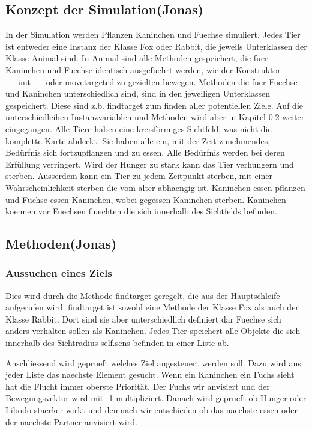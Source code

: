 \documentclass[12pt]{article}
\begin{document}
\subsection{Konzept der Simulation(Jonas)}
In der Simulation werden Pflanzen Kaninchen und Fuechse simuliert.
Jedes Tier ist entweder eine Instanz der Klasse \colorbox{gray!40}{Fox} oder
\colorbox{gray!40}{Rabbit}, die jeweils Unterklassen der Klasse
\colorbox{gray!40}{Animal} sind.
In Animal sind alle Methoden gespeichert, die fuer Kaninchen und Fuechse
identisch ausgefuehrt werden, wie der Konstruktor
\colorbox{gray!40}{\_\_init\_\_} oder \colorbox{gray!40}{movetargeted} zu gezielten bewegen.
Methoden die fuer Fuechse und Kaninchen unterschiedlich sind, sind in den
jeweiligen Unterklassen gespeichert.
Diese sind z.b. findtarget zum finden aller potentiellen Ziele.
Auf die unterschiedlcihen Instanzvariablen und Methoden wird aber in Kapitel \ref{methoden} weiter eingegangen.
Alle Tiere haben eine kreisförmiges Sichtfeld, was nicht die komplette Karte abdeckt.
Sie haben alle ein, mit der Zeit zunehmendes, Bedürfnis sich fortzupflanzen und zu essen.
Alle Bedürfnis werden bei deren Erfüllung verringert.
Wird der Hunger zu stark kann das Tier verhungern und sterben.
Ausserdem kann ein Tier zu jedem Zeitpunkt sterben, mit einer Wahrscheinlichkeit sterben die vom alter abhaengig ist.
Kaninchen essen pflanzen und Füchse essen Kaninchen, wobei gegessen Kaninchen sterben.
Kaninchen koennen vor Fuechsen fluechten die sich innerhalb des Sichtfelds befinden.

\subsection{Methoden(Jonas)}
\label{methoden}
\subsubsection{Aussuchen eines Ziels}
Dies wird durch die Methode \colorbox{gray!40}{findtarget} geregelt, die aus der Hauptschleife aufgerufen wird.
\colorbox{gray!40}{findtarget} ist sowohl eine Methode der Klasse
\colorbox{gray!40}{Fox} als auch der Klasse \colorbox{gray!40}{Rabbit}.
Dort sind sie aber unterschiedlich definiert dar Fuechse sich anders verhalten sollen als Kaninchen.
Jedes Tier speichert alle Objekte die sich innerhalb des Sichtradius
\colorbox{gray!40}{self.sens} befinden in einer Liste ab.

Anschliessend wird geprueft welches Ziel angesteuert werden soll.
Dazu wird aus jeder Liste das naechste Element gesucht.
Wenn ein Kaninchen ein Fuchs sieht hat die Flucht immer oberste Priorität.
Der Fuchs wir anvisiert und der Bewegungsvektor wird mit -1 multipliziert.
Danach wird geprueft ob Hunger oder Libodo staerker wirkt und demnach wir
entschieden ob das naechste essen oder der naechste Partner anvisiert wird.
\end{document}
